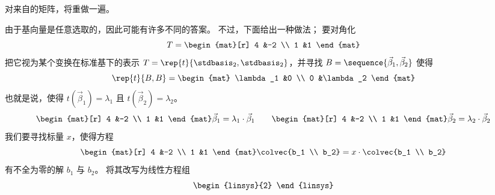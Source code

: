 \begin{exercises}
  \recommended \item
    对来自的矩阵，将重做一遍。
    \begin{answer}
      由于基向量是任意选取的，因此可能有许多不同的答案。
      不过，下面给出一种做法；
      要对角化
      \begin{equation*}
         T=\begin{mat}[r]
            4  &-2  \\
            1  &1
         \end{mat}
      \end{equation*}
      把它视为某个变换在标准基下的表示 $T=\rep{t}{\stdbasis_2,\stdbasis_2}$，并寻找
      \( B=\sequence{\vec{\beta}_1,\vec{\beta}_2} \) 使得
      \begin{equation*}
        \rep{t}{B,B}
        =
        \begin{mat}
          \lambda_1  &0          \\
          0          &\lambda_2
        \end{mat}
      \end{equation*}
      也就是说，使得
      $t(\vec{\beta}_1)=\lambda_1$ 且 $t(\vec{\beta}_2)=\lambda_2$。
      \begin{equation*}
        \begin{mat}[r]
           4  &-2  \\
           1  &1
        \end{mat}
        \vec{\beta}_1=\lambda_1\cdot\vec{\beta}_1
        \qquad
        \begin{mat}[r]
           4  &-2  \\
           1  &1
        \end{mat}
        \vec{\beta}_2=\lambda_2\cdot\vec{\beta}_2
      \end{equation*}
      我们要寻找标量 \( x \)，使得方程
      \begin{equation*}
       \begin{mat}[r]
          4  &-2  \\
          1  &1
       \end{mat}
       \colvec{b_1 \\ b_2}=x\cdot\colvec{b_1 \\ b_2}
      \end{equation*}
      有不全为零的解 $b_1$ 与 $b_2$。
      将其改写为线性方程组
      \begin{equation*}
        \begin{linsys}{2}

\end{linsys}
\end{equation*}
\end{answer}
\end{exercises}
